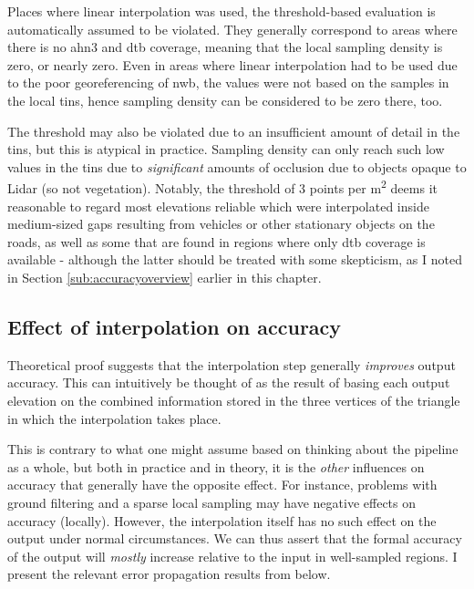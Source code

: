 Places where linear interpolation was used, the threshold-based evaluation is automatically assumed to be violated. They generally correspond to areas where there is no \ac{ahn3} and \ac{dtb} coverage, meaning that the local sampling density is zero, or nearly zero. Even in areas where linear interpolation had to be used due to the poor georeferencing of \ac{nwb}, the values were not based on the samples in the local \ac{tin}s, hence sampling density can be considered to be zero there, too.

The threshold may also be violated due to an insufficient amount of detail in the \ac{tin}s, but this is atypical in practice. Sampling density can only reach such low values in the \ac{tin}s due to \textit{significant} amounts of occlusion due to objects opaque to Lidar (so not vegetation). Notably, the threshold of 3 points per m\textsuperscript{2} deems it reasonable to regard most elevations reliable which were interpolated inside medium-sized gaps resulting from vehicles or other stationary objects on the roads, as well as some that are found in regions where only \ac{dtb} coverage is available - although the latter should be treated with some skepticism, as I noted in Section \ref{sub:accuracyoverview} earlier in this chapter.

\subsection{Effect of interpolation on accuracy}
\label{sub:m_accuracyinterpolation}

Theoretical proof suggests that the interpolation step generally \textit{improves} output accuracy. This can intuitively be thought of as the result of basing each output elevation on the combined information stored in the three vertices of the triangle in which the interpolation takes place.

This is contrary to what one might assume based on thinking about the pipeline as a whole, but both in practice and in theory, it is the \textit{other} influences on accuracy that generally have the opposite effect. For instance, problems with ground filtering and a sparse local sampling may have negative effects on accuracy (locally). However, the interpolation itself has no such effect on the output under normal circumstances. We can thus assert that the formal accuracy of the output will \textit{mostly} increase relative to the input in well-sampled regions. I present the relevant error propagation results from \cite{fan_etal_2014} below.

